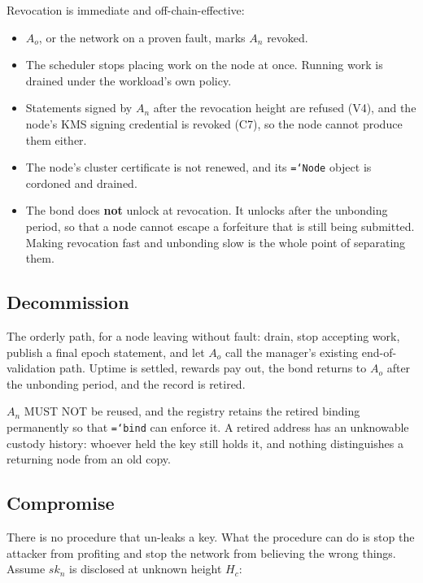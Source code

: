 \documentclass[11pt,a4paper]{article}
\newcommand{\code}[1]{\texttt{\hyphenchar\font=`\-\relax #1}}
\begin{document}
Revocation is immediate and off-chain-effective:

\begin{itemize}
\item $A_o$, or the network on a proven fault, marks $A_n$ revoked.
\item The scheduler stops placing work on the node at once. Running work is drained
  under the workload's own policy.
\item Statements signed by $A_n$ after the revocation height are refused (V4), and
  the node's KMS signing credential is revoked (C7), so the node cannot produce
  them either.
\item The node's cluster certificate is not renewed, and its \code{Node} object is
  cordoned and drained.
\item The bond does \textbf{not} unlock at revocation. It unlocks after the
  unbonding period, so that a node cannot escape a forfeiture that is still being
  submitted. Making revocation fast and unbonding slow is the whole point of
  separating them.
\end{itemize}

\subsection{Decommission}
\label{sec:decom}

The orderly path, for a node leaving without fault: drain, stop accepting work,
publish a final epoch statement, and let $A_o$ call the manager's existing
end-of-validation path. Uptime is settled, rewards pay out, the bond returns to
$A_o$ after the unbonding period, and the record is retired.

$A_n$ MUST NOT be reused, and the registry retains the retired binding permanently
so that \code{bind} can enforce it. A retired address has an unknowable custody
history: whoever held the key still holds it, and nothing distinguishes a returning
node from an old copy.

\subsection{Compromise}

There is no procedure that un-leaks a key. What the procedure can do is stop the
attacker from profiting and stop the network from believing the wrong things.
Assume $sk_n$ is disclosed at unknown height $H_c$:
\end{document}
